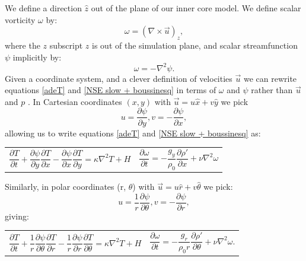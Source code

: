 \documentclass{article}
\begin{document}
\noindent We define a direction $\hat{z}$ out of the plane of our inner core model. We define scalar vorticity $\omega$ by:
\begin{equation}
	\omega = (\nabla \times \vec{u})_z,
	\label{omega}
\end{equation}
where the $z$ subscript $z$ is out of the simulation plane, and scalar streamfunction $\psi$ implicitly by:
\begin{equation}
	\omega = - \nabla^2 \psi.
	\label{psi}
\end{equation}
Given a coordinate system, and a clever definition of velocities $\vec{u}$ we can rewrite equations \ref{adeT} and \ref{NSE slow + boussinesq} in terms of $\omega$ and $\psi$ rather than $\vec{u}$ and $p$ \cite{tritton2012physical}. In Cartesian coordinates $(x,y)$ with $\vec{u} = u \hat{x} + v \hat{y}$ we pick 
\begin{equation}
	u = \frac{\partial \psi}{\partial y}, v = -\frac{\partial \psi}{\partial x},
	\label{cartesian velocities}
\end{equation}
allowing us to write equations \ref{adeT} and \ref{NSE slow + boussinesq} as:
\begin{tabularx}{\textwidth}{XX}
\begin{equation}
	\frac{\partial T}{\partial t} + \frac{\partial \psi}{\partial y} \frac{\partial T}{\partial x} - \frac{\partial \psi}{\partial x} \frac{\partial T}{\partial y} = \kappa \nabla^2 T + H
	\label{adeT sfvt cartesian}
\end{equation}
    &
\begin{equation}
	\frac{\partial \omega}{\partial t} = -\frac{g_y}{\rho_0} \frac{\partial \rho'}{\partial x} + \nu \nabla^2 \omega
	\label{NSE slow + boussinesq sfvt cartesian}
\end{equation}
\end{tabularx}\par
\noindent Similarly, in polar coordinates (r, $\theta$) with $\vec{u} = u \hat{r} + v \hat{\theta}$ we pick:
\begin{equation}
	u = \frac{1}{r} \frac{\partial \psi}{\partial \theta}, v = -\frac{\partial \psi}{\partial r},
	\label{polar velocities}
\end{equation}
giving:
\begin{tabularx}{\textwidth}{XX}
\begin{equation}
	\frac{\partial T}{\partial t} + \frac{1}{r} \frac{\partial \psi}{\partial \theta} \frac{\partial T}{\partial r} - \frac{1}{r} \frac{\partial \psi}{\partial r} \frac{\partial T}{\partial \theta} = \kappa \nabla^2 T + H
	\label{adeT sfvt polar}
\end{equation}
    &
\begin{equation}
	\frac{\partial \omega}{\partial t} = - \frac{g_r}{\rho_0 r} \frac{\partial \rho'}{\partial \theta} +\nu \nabla^2 \omega.
	\label{NSE slow + boussinesq sfvt polar}
\end{equation}
\end{tabularx}\par
\end{document}
